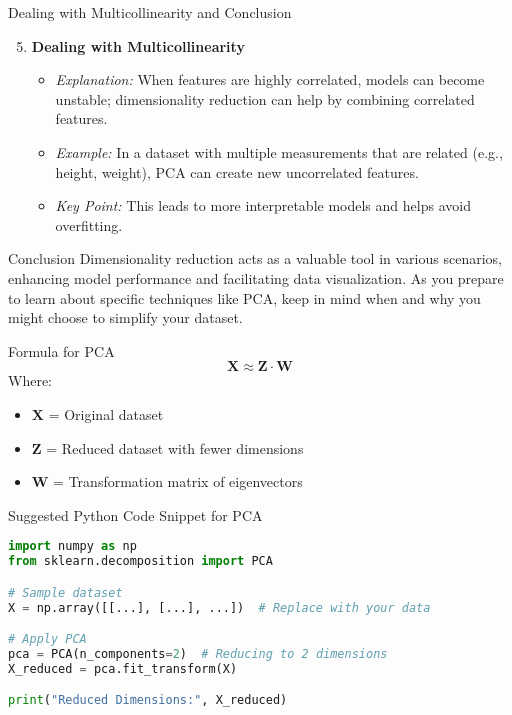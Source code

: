 \documentclass[aspectratio=169]{beamer}
\begin{document}
\begin{frame}[fragile]{Dealing with Multicollinearity and Conclusion}
    \begin{enumerate}
        \setcounter{enumi}{4}
        \item \textbf{Dealing with Multicollinearity}
            \begin{itemize}
                \item \textit{Explanation:} When features are highly correlated, models can become unstable; dimensionality reduction can help by combining correlated features.
                \item \textit{Example:} In a dataset with multiple measurements that are related (e.g., height, weight), PCA can create new uncorrelated features.
                \item \textit{Key Point:} This leads to more interpretable models and helps avoid overfitting.
            \end{itemize}
    \end{enumerate}

    \begin{block}{Conclusion}
        Dimensionality reduction acts as a valuable tool in various scenarios, enhancing model performance and facilitating data visualization. As you prepare to learn about specific techniques like PCA, keep in mind when and why you might choose to simplify your dataset.
    \end{block}
\end{frame}

\begin{frame}[fragile]{Formula for PCA}
    \begin{equation}
        \mathbf{X} \approx \mathbf{Z} \cdot \mathbf{W}
    \end{equation}
    Where:
    \begin{itemize}
        \item \(\mathbf{X}\) = Original dataset
        \item \(\mathbf{Z}\) = Reduced dataset with fewer dimensions
        \item \(\mathbf{W}\) = Transformation matrix of eigenvectors
    \end{itemize}
\end{frame}

\begin{frame}[fragile]{Suggested Python Code Snippet for PCA}
    \begin{lstlisting}[language=Python]
import numpy as np
from sklearn.decomposition import PCA

# Sample dataset
X = np.array([[...], [...], ...])  # Replace with your data

# Apply PCA
pca = PCA(n_components=2)  # Reducing to 2 dimensions
X_reduced = pca.fit_transform(X)

print("Reduced Dimensions:", X_reduced)
    \end{lstlisting}
\end{frame}
\end{document}
